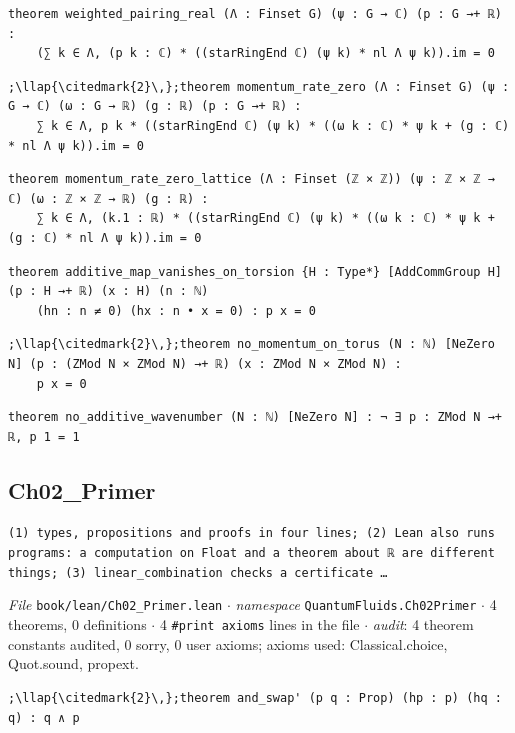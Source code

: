 \begin{lstlisting}[style=leancat]
theorem weighted_pairing_real (Λ : Finset G) (ψ : G → ℂ) (p : G →+ ℝ) :
    (∑ k ∈ Λ, (p k : ℂ) * ((starRingEnd ℂ) (ψ k) * nl Λ ψ k)).im = 0
\end{lstlisting}

\begin{lstlisting}[style=leancat]
;\llap{\citedmark{2}\,};theorem momentum_rate_zero (Λ : Finset G) (ψ : G → ℂ) (ω : G → ℝ) (g : ℝ) (p : G →+ ℝ) :
    ∑ k ∈ Λ, p k * ((starRingEnd ℂ) (ψ k) * ((ω k : ℂ) * ψ k + (g : ℂ) * nl Λ ψ k)).im = 0
\end{lstlisting}

\begin{lstlisting}[style=leancat]
theorem momentum_rate_zero_lattice (Λ : Finset (ℤ × ℤ)) (ψ : ℤ × ℤ → ℂ) (ω : ℤ × ℤ → ℝ) (g : ℝ) :
    ∑ k ∈ Λ, (k.1 : ℝ) * ((starRingEnd ℂ) (ψ k) * ((ω k : ℂ) * ψ k + (g : ℂ) * nl Λ ψ k)).im = 0
\end{lstlisting}

\begin{lstlisting}[style=leancat]
theorem additive_map_vanishes_on_torsion {H : Type*} [AddCommGroup H] (p : H →+ ℝ) (x : H) (n : ℕ)
    (hn : n ≠ 0) (hx : n • x = 0) : p x = 0
\end{lstlisting}

\begin{lstlisting}[style=leancat]
;\llap{\citedmark{2}\,};theorem no_momentum_on_torus (N : ℕ) [NeZero N] (p : (ZMod N × ZMod N) →+ ℝ) (x : ZMod N × ZMod N) :
    p x = 0
\end{lstlisting}

\begin{lstlisting}[style=leancat]
theorem no_additive_wavenumber (N : ℕ) [NeZero N] : ¬ ∃ p : ZMod N →+ ℝ, p 1 = 1
\end{lstlisting}

\subsection{Ch02\_\allowbreak{}Primer}
{\footnotesize\raggedright\texttt{(1) types,\allowbreak{} propositions and proofs in four lines; (2) Lean also runs programs: a computation on Float and a theorem about ℝ are different things; (3) linear\_\allowbreak{}combination checks a certificate …}\par}
{\footnotesize\raggedright\emph{File} \texttt{book/lean/Ch02\_\allowbreak{}Primer.\allowbreak{}lean} $\cdot$ \emph{namespace} \texttt{QuantumFluids.\allowbreak{}Ch02Primer} $\cdot$ 4 theorems, 0 definitions $\cdot$ 4 \texttt{\#print axioms} lines in the file $\cdot$ \emph{audit}: 4 theorem constants audited, 0 sorry, 0 user axioms; axioms used: Classical.choice, Quot.sound, propext.\par}
\begin{lstlisting}[style=leancat]
;\llap{\citedmark{2}\,};theorem and_swap' (p q : Prop) (hp : p) (hq : q) : q ∧ p
\end{lstlisting}

